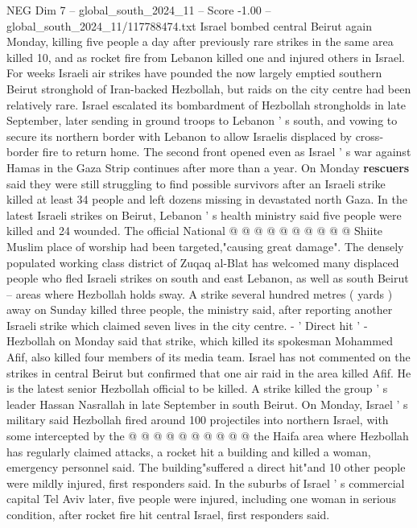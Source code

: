 \begin{textsample}{NEG Dim 7 – global\_south\_2024\_11 – Score -1.00 – global\_south\_2024\_11/117788474.txt}  \label{ex:f7_neg_313}
Israel bombed central Beirut again Monday, killing five people a day after previously rare strikes in the same area killed 10, and as rocket fire from Lebanon killed one and injured others in Israel.
For weeks Israeli air strikes have pounded the now largely emptied southern Beirut stronghold of Iran-backed Hezbollah, but raids on the city centre had been relatively rare.
Israel escalated its bombardment of Hezbollah strongholds in late September, later sending in ground troops to Lebanon ' s south, and vowing to secure its northern border with Lebanon to allow Israelis displaced by cross-border fire to return home.
The second front opened even as Israel ' s war against Hamas in the Gaza Strip continues after more than a year.
On Monday \textbf{rescuers} said they were still struggling to find possible survivors after an Israeli strike killed at least 34 people and left dozens missing in devastated north Gaza.
In the latest Israeli strikes on Beirut, Lebanon ' s health ministry said five people were killed and 24 wounded.
The official National @ @ @ @ @ @ @ @ @ @ Shiite Muslim place of worship had been targeted,"causing great damage".
The densely populated working class district of Zuqaq al-Blat has welcomed many displaced people who fled Israeli strikes on south and east Lebanon, as well as south Beirut -- areas where Hezbollah holds sway.
A strike several hundred metres ( yards ) away on Sunday killed three people, the ministry said, after reporting another Israeli strike which claimed seven lives in the city centre. - ' Direct hit ' - Hezbollah on Monday said that strike, which killed its spokesman Mohammed Afif, also killed four members of its media team.
Israel has not commented on the strikes in central Beirut but confirmed that one air raid in the area killed Afif.
He is the latest senior Hezbollah official to be killed.
A strike killed the group ' s leader Hassan Nasrallah in late September in south Beirut.
On Monday, Israel ' s military said Hezbollah fired around 100 projectiles into northern Israel, with some intercepted by the @ @ @ @ @ @ @ @ @ @ the Haifa area where Hezbollah has regularly claimed attacks, a rocket hit a building and killed a woman, emergency personnel said.
The building"suffered a direct hit"and 10 other people were mildly injured, first responders said.
In the suburbs of Israel ' s commercial capital Tel Aviv later, five people were injured, including one woman in serious condition, after rocket fire hit central Israel, first responders said.

\end{textsample}
